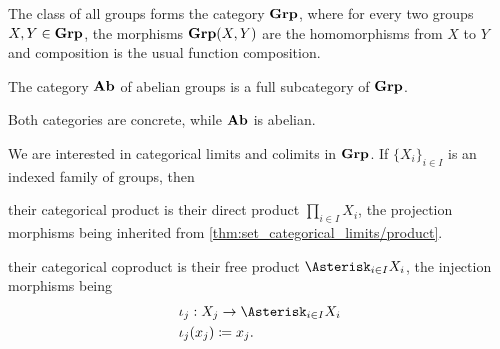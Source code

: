 \begin{definition}\label{def:category_of_groups}
  The class of all groups forms the category $\operatorname{\mathbf{Grp}}$, where for every two groups $X, Y \in \operatorname{\mathbf{Grp}}$, the morphisms $\operatorname{\mathbf{Grp}}(X, Y)$ are the homomorphisms from $X$ to $Y$ and composition is the usual function composition.

  The category $\operatorname{\mathbf{Ab}}$ of abelian groups is a full subcategory of $\operatorname{\mathbf{Grp}}$.

  Both categories are concrete, while $\operatorname{\mathbf{Ab}}$ is abelian.
\end{definition}

\begin{proposition}\label{thm:group_categorical_limits}
  We are interested in categorical limits and colimits in $\operatorname{\mathbf{Grp}}$. If $\{ X_i \}_{i \in I}$ is an indexed family of groups, then
  \begin{defenum}
    \item\label{thm:group_categorical_limits/product} their categorical product is their direct product $\prod_{i \in I} X_i$, the projection morphisms being inherited from \cref{thm:set_categorical_limits/product}.

    \item\label{thm:group_categorical_limits/coproduct} their categorical coproduct is their free product $\Asterisk_{i \in I} X_i$, the injection morphisms being
    \begin{align*}
      &\iota_j: X_j \to \Asterisk_{i \in I} X_i \\
      &\iota_j(x_j) \coloneqq x_j.
    \end{align*}
  \end{defenum}
\end{proposition}

